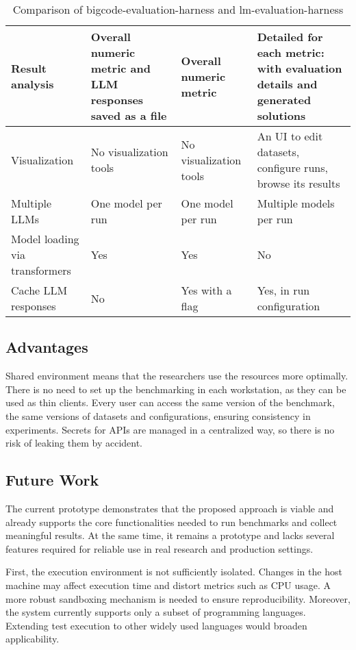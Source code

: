 \begin{table}[H]
\begin{tabular}{|p{2.3cm}|p{4.3cm}|p{4.3cm}|p{4.3cm}|}
        \hline
        Result analysis & Overall numeric metric and LLM responses saved as a file & Overall numeric metric & Detailed for each metric: with evaluation details and generated solutions  \\
        \hline
        Visualization & No visualization tools & No visualization tools & An UI to edit datasets, configure runs, browse its results \\
        \hline
        Multiple LLMs & One model per run & One model per run & Multiple models per run\\
        \hline
        Model loading via transformers & Yes & Yes & No \\
        \hline
        Cache LLM responses & No & Yes with a flag & Yes, in run configuration \\
        \hline
    \end{tabular}
    \caption{Comparison of bigcode-evaluation-harness and lm-evaluation-harness}
    \label{tab:framework-comparison-with-proposed}
\end{table}

\subsection{Advantages}

Shared environment means that the researchers use the resources more optimally.
There is no need to set up the benchmarking in each workstation, as they can be used as thin clients.
Every user can access the same version of the benchmark, the same versions of datasets and configurations, ensuring consistency in experiments.
Secrets for APIs are managed in a centralized way, so there is no risk of leaking them by accident.

\subsection{Future Work}

The current prototype demonstrates that the proposed approach is viable and already supports the core functionalities needed to run benchmarks and collect meaningful results.
At the same time, it remains a prototype and lacks several features required for reliable use in real research and production settings.

First, the execution environment is not sufficiently isolated.
Changes in the host machine may affect execution time and distort metrics such as CPU usage.
A more robust sandboxing mechanism is needed to ensure reproducibility.
Moreover, the system currently supports only a subset of programming languages.
Extending test execution to other widely used languages would broaden applicability.

